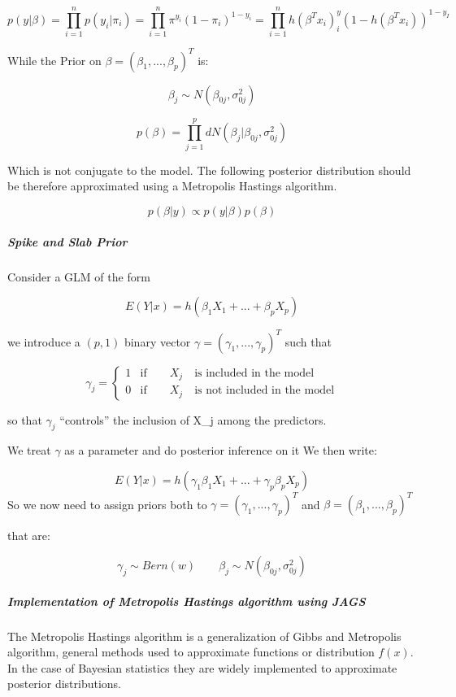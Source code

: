 \documentclass[
]{article}
\begin{document}
\[p(y | \beta) = \prod_{i=1}^n p(y_i | \pi_i)   = \prod_{i=1}^n \pi^{y_i}(1 - \pi_i)^{1-y_i} = \prod_{i=1}^n h(\beta^Tx_i)^y_i (1-h(\beta^Tx_i))^{1-y_I}\]

While the Prior on \(\beta = (\beta_1,...,\beta_p)^T\) is:

\[\beta_j \sim N(\beta_{0j}, \sigma^2_{0j})\]

\[p(\beta) = \prod_{j=1}^p dN(\beta_j | \beta_{0j}, \sigma^2_{0j})\]

Which is not conjugate to the model. The following posterior
distribution should be therefore approximated using a Metropolis
Hastings algorithm.

\[p(\beta | y) \propto p(y | \beta)p(\beta)\]

\hypertarget{spike-and-slab-prior}{%
\subparagraph{Spike and Slab Prior}\label{spike-and-slab-prior}}

Consider a GLM of the form

\[E(Y|x) = h(\beta_1 X_1 + ... + \beta_pX_p)\]

we introduce a \((p,1)\) binary vector
\(\gamma = (\gamma_1,...,\gamma_p)^T\) such that

\[\gamma_j = \begin{cases} 1 & \mbox{if} \qquad X_j \quad \mbox{is included in the model}\\ 0 & \mbox{if} \qquad X_j \quad \mbox{is not included in the model} \end{cases}\]

so that \(\gamma_j\) ``controls'' the inclusion of X\_j among the
predictors.

We treat \(\gamma\) as a parameter and do posterior inference on it We
then write:

\[E(Y|x) = h(\gamma_1\beta_1 X_1 + ... + \gamma_p\beta_pX_p)\] So we now
need to assign priors both to \(\gamma = (\gamma_1,...,\gamma_p)^T\) and
\(\beta = (\beta_1,...,\beta_p)^T\)

that are:

\[\gamma_j \sim Bern(w) \qquad \beta_j \sim N(\beta_{0j},\sigma^2_{0j})\]

\hypertarget{implementation-of-metropolis-hastings-algorithm-using-jags}{%
\subparagraph{Implementation of Metropolis Hastings algorithm using
JAGS}\label{implementation-of-metropolis-hastings-algorithm-using-jags}}

The Metropolis Hastings algorithm is a generalization of Gibbs and
Metropolis algorithm, general methods used to approximate functions or
distribution \(f(x)\). In the case of Bayesian statistics they are
widely implemented to approximate posterior distributions.
\end{document}
